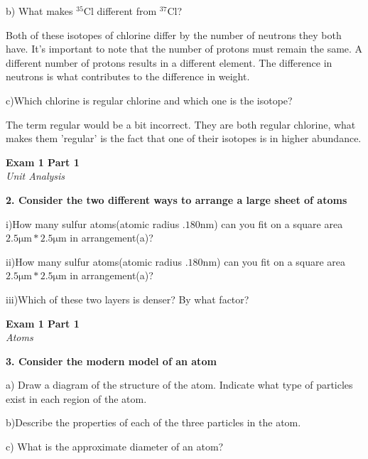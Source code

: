 \documentclass{article}
\begin{document}
    b) What makes ${}^{35}$Cl different from ${}^{37}$Cl?

    Both of these isotopes of chlorine differ by the number of neutrons they both have. It's important to note that the number of protons must remain the same. A different number of protons results in a different element. The difference in neutrons is what contributes to the difference in weight.

    c)Which chlorine is regular chlorine and which one is the isotope?

    The term regular would be a bit incorrect. They are both regular chlorine, what makes them 'regular' is the fact that one of their isotopes is in higher abundance.

    \pagebreak

    \begin{center}
        \textbf{Exam 1 Part 1}\\
        \textit{Unit Analysis}
    \end{center}
    \textbf{2. Consider the two different ways to arrange a large sheet of atoms}

    i)How many sulfur atoms(atomic radius $.180 \si{\nano\metre}$) can you fit on a square area $2.5 \si{\micro\metre} * 2.5 \si{\micro\metre}$ in arrangement(a)?

    ii)How many sulfur atoms(atomic radius $.180 \si{\nano\metre}$) can you fit on a square area $2.5 \si{\micro\metre} * 2.5 \si{\micro\metre}$ in arrangement(a)?

    iii)Which of these two layers is denser? By what factor?

    \pagebreak

    \begin{center}
        \textbf{Exam 1 Part 1}\\
        \textit{Atoms}
    \end{center}
    \textbf{3. Consider the modern model of an atom}

    a) Draw a diagram of the structure of the atom. Indicate what type of particles exist in each region of the atom.

    b)Describe the properties of each of the three particles in the atom.

    c) What is the approximate diameter of an atom?
    \pagebreak
\end{document}

